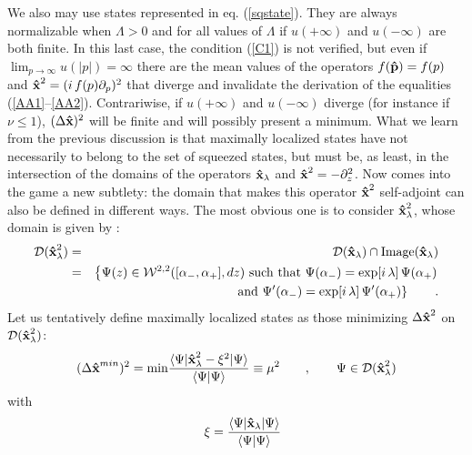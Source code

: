 \documentclass[a4paper,10pt]{article}
\newcommand{\x}{\mbox{\rm{\bf \^ x}}}
\newcommand{\p}{\mbox{\rm{\bf \^ p}}}
\newcommand{\xl}{\x_{\lambda}}
\newcommand{\cD}{{\cal D}}
\newcommand{\cW}{{\cal W}}
\begin{document}
We also may use states represented in eq. (\ref{sqstate}). They
are always normalizable when $\Lambda>0$ and for all values of
$\Lambda$ if $u(+\infty)$ and $u(-\infty)$ are both finite. In
this last case, the condition (\ref{C1}) is not verified, but even
if $\lim_{p\to\infty}u(|p|)=\infty$ there are the mean values of
the operators $f(\p)=f(p)$ and $\x^2=(i\,f(p)\partial_p)^2$ that
diverge and invalidate the derivation of the equalities
(\ref{AA1}--\ref{AA2}). Contrariwise, if $u(+\infty)$ and
$u(-\infty)$ diverge (for instance if $\nu\leq 1$), $(\Delta
\x)^2$ will be finite and will possibly present a minimum. What we
learn from the previous discussion is that maximally localized
states have not necessarily to belong to the set of squeezed
states, but must be, as least, in the intersection of the domains
of the operators $\x_\lambda$ and $\x^2=-\partial^2_z$. Now comes
into the game a new subtlety: the domain that makes this operator
$\x^2$ self-adjoint can also be defined in different ways. The
most obvious one is to consider $\x^2_\lambda$, whose domain is
given by :
\begin{eqnarray}
\cD(\x^2_\lambda)&=&\cD(\x_\lambda)\cap {\rm
Image}(\x_\lambda)\label{defxl2}\\ &=&\left\{\Psi(z)\in
\cW^{2,2}([\alpha_-,\alpha_+],dz)\ {\rm such\ that\
}\Psi(\alpha_-)=\exp[i\,\lambda]\,\Psi(\alpha_+)\right.\nonumber\\
&&\left. {\rm and}\
\Psi'(\alpha_-)=\exp[i\,\lambda]\,\Psi'(\alpha_+)\right\}\qquad
.\label{bcxl2}
\end{eqnarray}
Let us tentatively define maximally localized states as those
minimizing $\Delta\x^2$ on $\cD(\x^2_\lambda)$:
\begin{equation}\label{x2vp}
(\Delta \x^{min})^2={\rm
min}\frac{\langle\Psi|\x^2_\lambda-\xi^2|\Psi\rangle}{\langle\Psi|\Psi\rangle}\equiv
\mu^2\qquad,\qquad \Psi\in\cD(\x^2_\lambda)
\end{equation}
with
\begin{equation}
\quad\xi
=\frac{\langle\Psi|\xl|\Psi\rangle}{\langle\Psi|\Psi\rangle}\label{locond}
\end{equation}
\end{document}
